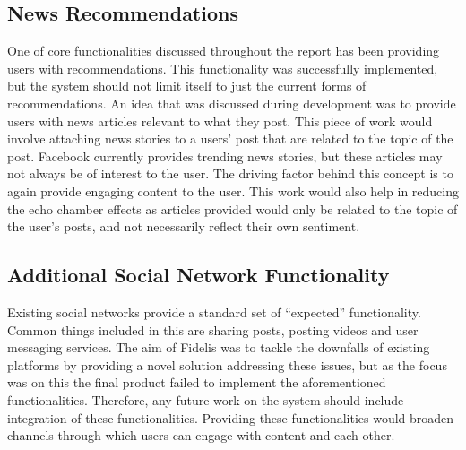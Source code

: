 \subsection{News Recommendations}
One of core functionalities discussed throughout the report has been providing users with recommendations. This functionality was successfully implemented, but the system should not limit itself to just the current forms of recommendations. An idea that was discussed during development was to provide users with news articles relevant to what they post.
This piece of work would involve attaching news stories to a users' post that are related to the topic of the post. Facebook currently provides trending news stories, but these articles may not always be of interest to the user. The driving factor behind this concept is to again provide engaging content to the user. This work would also help in reducing the echo chamber effects as articles provided would only be related to the topic of the user's posts, and not necessarily reflect their own sentiment.

\subsection{Additional Social Network Functionality}
Existing social networks provide a standard set of ``expected'' functionality. Common things included in this are sharing posts, posting videos and user messaging services. The aim of Fidelis was to tackle the downfalls of existing platforms by providing a novel solution addressing these issues, but as the focus was on this the final product failed to implement the aforementioned functionalities. Therefore, any future work on the system should include integration of these functionalities. Providing these functionalities would broaden channels through which users can engage with content and each other.